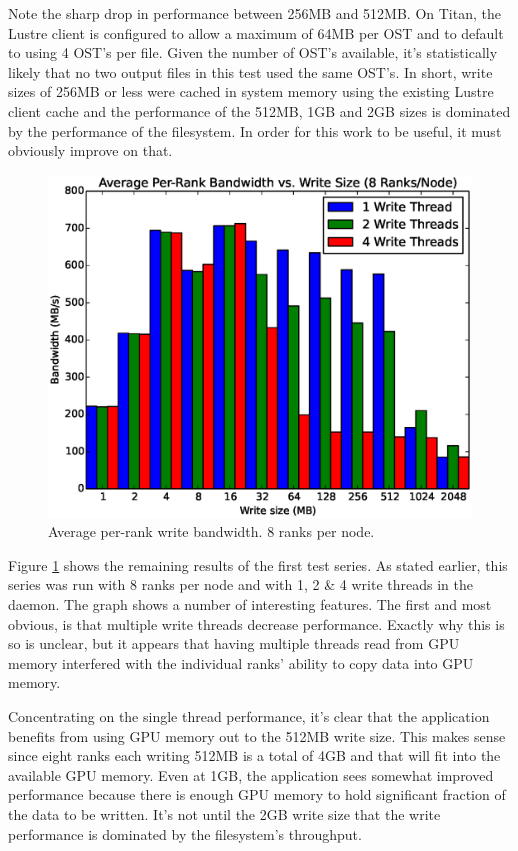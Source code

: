 Note the sharp drop in performance between 256MB and 512MB.  On Titan, the Lustre client is configured to allow a maximum of 64MB per OST and to default to using 4 OST's per file.  Given the number of OST's available, it's statistically likely that no two output files in this test used the same OST's.  In short, write sizes of 256MB or less were cached in system memory using the existing Lustre client cache and the performance of the 512MB, 1GB and 2GB sizes is dominated by the performance of the filesystem.  In order for this work to be useful, it must obviously improve on that.

\begin{figure}
\includegraphics[width=\linewidth]{figures/figure_2.eps}
\caption{Average per-rank write bandwidth.  8 ranks per node.} 
\label{fig:results_8_nobars}
\end{figure}

Figure \ref{fig:results_8_nobars} shows the remaining results of the first test series.  As stated earlier, this series was run with 8 ranks per node and with 1, 2 \& 4 write threads in the daemon.  The graph shows a number of interesting features.  The first and most obvious, is that multiple write threads decrease performance.  Exactly why this is so is unclear, but it appears that having multiple threads read from GPU memory interfered with the individual ranks' ability to copy data into GPU memory.  

Concentrating on the single thread performance, it's clear that the application benefits from using GPU memory out to the 512MB write size.  This makes sense since eight ranks each writing 512MB is a total of 4GB and that will fit into the available GPU memory.  Even at 1GB, the application sees somewhat improved performance because there is enough GPU memory to hold significant fraction of the data to be written.  It's not until the 2GB write size that the write performance is dominated by the filesystem's throughput.

